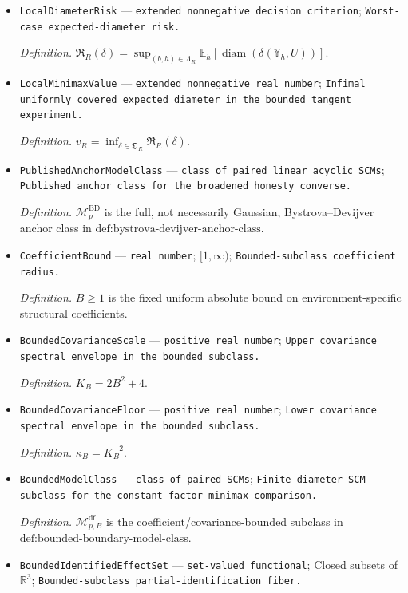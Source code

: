 \documentclass{article}
\begin{document}
\begin{itemize}
  \item \texttt{LocalDiameterRisk} --- \texttt{extended nonnegative decision criterion}; \texttt{Worst-\allowbreak{}case expected-\allowbreak{}diameter risk.}
  \par\smallskip\noindent\emph{Definition.} \(\mathfrak R_R(\delta)=\sup_{(b,h)\in\Lambda_R}\mathbb E_h[\operatorname{diam}(\delta(\mathbb Y_h,U))]\).
  \item \texttt{LocalMinimaxValue} --- \texttt{extended nonnegative real number}; \texttt{Infimal uniformly covered expected diameter in the bounded tangent experiment.}
  \par\smallskip\noindent\emph{Definition.} \(v_R=\inf_{\delta\in\mathfrak D_R}\mathfrak R_R(\delta)\).
  \item \texttt{PublishedAnchorModelClass} --- \texttt{class of paired linear acyclic SCMs}; \texttt{Published anchor class for the broadened honesty converse.}
  \par\smallskip\noindent\emph{Definition.} \(\mathcal M_p^{\mathrm{BD}}\) is the full, not necessarily Gaussian, Bystrova--Devijver anchor class in \(\text{def:bystrova-devijver-anchor-class}\).
  \item \texttt{CoefficientBound} --- \texttt{real number}; \([1,\infty)\); \texttt{Bounded-\allowbreak{}subclass coefficient radius.}
  \par\smallskip\noindent\emph{Definition.} \(B\ge1\) is the fixed uniform absolute bound on environment-specific structural coefficients.
  \item \texttt{BoundedCovarianceScale} --- \texttt{positive real number}; \texttt{Upper covariance spectral envelope in the bounded subclass.}
  \par\smallskip\noindent\emph{Definition.} \(K_B=2B^2+4\).
  \item \texttt{BoundedCovarianceFloor} --- \texttt{positive real number}; \texttt{Lower covariance spectral envelope in the bounded subclass.}
  \par\smallskip\noindent\emph{Definition.} \(\kappa_B=K_B^{-2}\).
  \item \texttt{BoundedModelClass} --- \texttt{class of paired SCMs}; \texttt{Finite-\allowbreak{}diameter SCM subclass for the constant-\allowbreak{}factor minimax comparison.}
  \par\smallskip\noindent\emph{Definition.} \(\mathcal M_{p,B}^{\mathrm{df}}\) is the coefficient/covariance-bounded subclass in \(\text{def:bounded-boundary-model-class}\).
  \item \texttt{BoundedIdentifiedEffectSet} --- \texttt{set-\allowbreak{}valued functional}; Closed subsets of \(\mathbb R^3\); \texttt{Bounded-\allowbreak{}subclass partial-\allowbreak{}identification fiber.}

\end{itemize}
\end{document}
